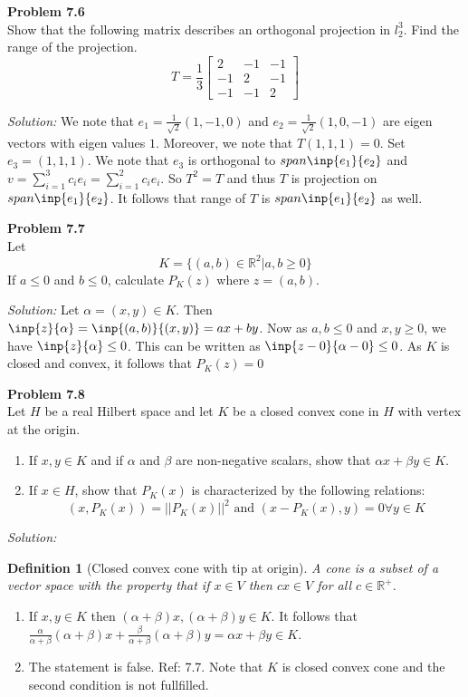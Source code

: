 \documentclass[a4paper, 11pt]{article}
\newenvironment{problem}[2][Problem]
    { \begin{mdframed}[backgroundcolor=gray!20] \textbf{#1 #2} \\}
    {  \end{mdframed}}
\newenvironment{solution}
    {\textit{Solution:}}
    {}
\newtheorem*{definition}{Definition}
\begin{document}
\begin{problem}{7.6}
Show that the following matrix describes an orthogonal projection in $l_2^3$. Find the range of the projection. 
$$T=\frac{1}{3}\begin{bmatrix}
    2&-1&-1\\
    -1&2&-1\\
    -1&-1&2
\end{bmatrix}$$    
\end{problem}
\begin{solution}
    We note that $e_1=\frac{1}{\sqrt2}(1,-1,0)$ and $e_2=\frac{1}{\sqrt2}(1,0,-1)$ are eigen vectors with eigen values $1$. Moreover, we note that $T(1,1,1)=0$. Set $e_3=(1,1,1)$. We note that $e_3$ is orthogonal to $span\inp{e_1}{e_2}$ and $v=\sum_{i=1}^3c_ie_i=\sum_{i=1}^2c_ie_i$. So $T^2=T$ and thus $T$ is projection on $span\inp{e_1}{e_2}$. It follows that range of $T$ is $span\inp{e_1}{e_2}$ as well. 
\end{solution}
\begin{problem}{7.7}
    Let $$K=\{(a,b)\in\mathbb R^2|a,b\geq0\}$$ If $a\leq 0$ and $b\leq 0$, calculate $P_K(z)$ where $z=(a,b)$. 
\end{problem}
\begin{solution}
    Let $\alpha=(x,y)\in K$. Then $\inp{z}{\alpha}=\inp{(a,b)}{(x,y)}=ax+by$. Now as $a,b\leq 0$ and $x,y\geq 0$, we have $\inp{z}{\alpha}\leq 0$. This can be written as $\inp{z-0}{\alpha-0}\leq 0$. As $K$ is closed and convex, it follows that  $P_K(z)=0$
\end{solution}
\begin{problem}{7.8}
    Let $H$ be a real Hilbert space and let $K$ be a closed convex cone in
    $H$ with vertex at the origin. 
    \begin{enumerate}
        \item If $x, y \in K$ and if $\alpha$ and $\beta$ are non-negative scalars, show that
        $\alpha x + \beta y \in K$.
        \item If $x\in H$, show that $P_K(x)$ is characterized by the following relations:
        $$(x,P_K(x))=||P_K(x)||^2\text{ and }(x-P_K(x),y)=0\forall y\in K$$
    \end{enumerate}
\end{problem}

\begin{solution}
    \begin{definition}[Closed convex cone with tip at origin]
        A cone is a subset of a vector space with the property that if $x\in V$ then $cx\in V$ for all $c\in\mathbb R^+$.
    \end{definition}
    \begin{enumerate}
        \item If $x,y\in K$ then $(\alpha+\beta)x,(\alpha+\beta)y\in K$. It follows that $\frac{\alpha}{\alpha+\beta}(\alpha+\beta)x+\frac{\beta}{\alpha+\beta}(\alpha+\beta)y=\alpha x+\beta y\in K$.
        \item The statement is false. Ref: 7.7. Note that $K$ is closed convex cone and the second condition is not fullfilled. 
    \end{enumerate}
\end{solution}
\end{document}
